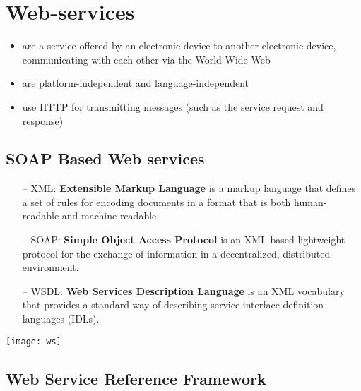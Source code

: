 \newpage
\section{Web-services}
\begin{itemize}
\item are a service offered by an electronic device to another electronic device, communicating with each other via the World Wide Web
\item are \textcolor{b}{platform-independent} and \textcolor{b}{language-independent}
\item use \textcolor{b}{HTTP} for transmitting messages (such as the service request and response)
\end{itemize}

\subsection*{SOAP Based Web services}
\begin{itemize}
\item[--] \textcolor{g}{XML}: \textbf{Extensible Markup Language} is a markup language that defines a set of rules for encoding documents in a format that is both human-readable and machine-readable. 
\item[--] \textcolor{g}{SOAP}: \textbf{Simple Object Access Protocol} is an XML-based lightweight protocol for the exchange of information in a decentralized, distributed environment.
\item[--] \textcolor{g}{WSDL}: \textbf{Web Services Description Language} is an XML vocabulary that provides a standard way of describing service interface definition languages (IDLs).
\end{itemize}
\begin{Figure}
\centering
\texttt{[image: ws]}
\label{fig:SOAP}
\end{Figure}

\subsection*{Web Service Reference Framework}

